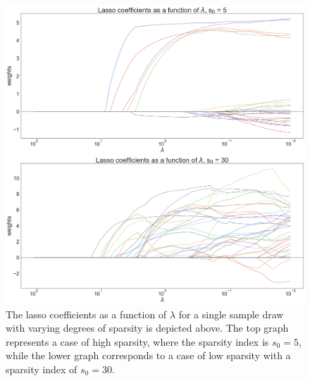 \begin{figure}[H]
        \includegraphics[scale=0.2]{material/Img/lasso_plot_betas.png}
        \centering
        \caption[Lasso coefficients as a function of $\lambda$ for a single sample draw]{The lasso coefficients as a function of $\lambda$ for a single sample draw with varying degrees of sparsity is depicted above. The top graph represents a case of high sparsity, where the sparsity index is $s_{0}=5$, while the lower graph corresponds to a case of low sparsity with a sparsity index of $s_{0}=30$.}  
        \label{fig:lasso_single_sample}
\end{figure}
    
